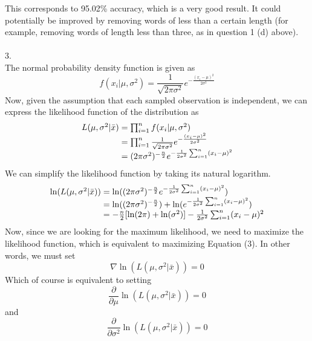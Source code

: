 \documentclass[10pt]{article}
\begin{document}
This corresponds to 95.02\% accuracy, which is a very good result. It could potentially be improved by removing words of less than a certain length (for example, removing words of length less than three, as in question 1 (d) above).\\
\\
3.\\
The normal probability density function is given as
\begin{equation}
f(x_{i}|\mu,\sigma^2) = \frac{1}{\sqrt{2 \pi \sigma^{2}}}e^{-\frac{(x_{i}-\mu)^2}{2\sigma^2}}
\end{equation}
Now, given the assumption that each sampled observation is independent, we can express the likelihood function of the distribution as
\begin{equation}
\begin{array}{l@{{}={}}l}
L(\mu,\sigma^2 | \bar{x}) 
& \prod_{i=1}^{n} f(x_{i}|\mu,\sigma^2) \\
& \prod_{i=1}^{n} \frac{1}{\sqrt{2 \pi \sigma^{2}}}e^{-\frac{(x_{i}-\mu)^2}{2\sigma^2}} \\
& (2 \pi \sigma^{2})^{-\frac{n}{2}} e^{-\frac{1}{2\sigma^2}\sum_{i=1}^{n}(x_{i} - \mu)^2}
\end{array}
\end{equation}
We can simplify the likelihood function by taking its natural logarithm.
\begin{equation}
\begin{array}{l@{{}={}}l}
\ln(L(\mu,\sigma^2 | \bar{x})) 
& \ln((2 \pi \sigma^{2})^{-\frac{n}{2}} e^{-\frac{1}{2\sigma^2}\sum_{i=1}^{n}(x_{i} - \mu)^2}) \\
& \ln ((2 \pi \sigma^{2})^{-\frac{n}{2}}) + \ln(e^{-\frac{1}{2\sigma^2}\sum_{i=1}^{n}(x_{i} - \mu)^2}) \\
& -\frac{n}{2}[\ln(2\pi)+\ln(\sigma^2)] -\frac{1}{2\sigma^2}\sum_{i=1}^{n}(x_{i} - \mu)^2 
\end{array}
\end{equation}
Now, since we are looking for the maximum likelihood, we need to maximize the likelihood function, which is equivalent to maximizing Equation (3). In other words, we must set
\begin{equation}
\nabla \ln(L(\mu,\sigma^2 | \bar{x})) = 0
\end{equation}
Which of course is equivalent to setting
\begin{equation}
\frac{\partial}{\partial \mu} \ln(L(\mu,\sigma^2 | \bar{x})) = 0 
\end{equation}
and
\begin{equation}
\frac{\partial}{\partial \sigma^2} \ln(L(\mu,\sigma^2 | \bar{x})) = 0 
\end{equation}
\end{document}
